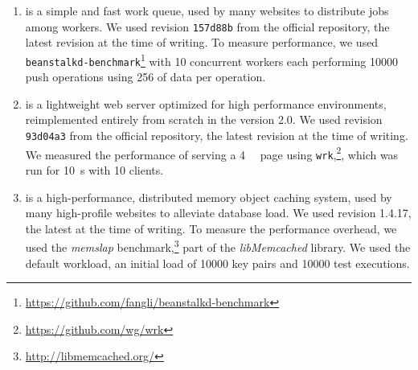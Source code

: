 \begin{enumerate}

\item[\beanstalkd\footnote{\url{http://kr.github.io/beanstalkd/}}]
is a simple and fast work queue, used by many websites to
distribute jobs among workers. We used revision \lstinline`157d88b` from the
official \git repository, the latest revision at the time of
writing.  To measure performance, we used
\lstinline`beanstalkd-benchmark`\footnote{\url{https://github.com/fangli/beanstalkd-benchmark}}
with \num{10} concurrent workers each performing \num{10000} push operations
using \SI{256}{\byte} of data per operation.


\item[\lighttpdtwo\footnote{\url{https://github.com/lighttpd/lighttpd2}}]
is a lightweight web server optimized for high performance environments,
reimplemented entirely from scratch in the version 2.0.  We used
revision \lstinline`93d04a3` from the official \git repository, the
latest revision at the time of writing. We measured the performance of serving
a \SI{4}{\kilo\byte} page using
\lstinline`wrk`,\footnote{\url{https://github.com/wg/wrk}}, which was run for
\SI{10}{\second} with \num{10} clients.

\item[\memcached\footnote{\url{http://memcached.org/}}]
is a high-performance, distributed memory object caching system, used by
many high-profile websites to alleviate database load. We used 
revision 1.4.17, the latest at the time of writing. To measure the performance
overhead, we used the \emph{memslap} benchmark,\footnote{\url{http://libmemcached.org/}}
part of the \emph{libMemcached} library. We used the default workload,
\ie an initial load of \num{10000} key pairs and \num{10000} test executions.



\end{enumerate}

